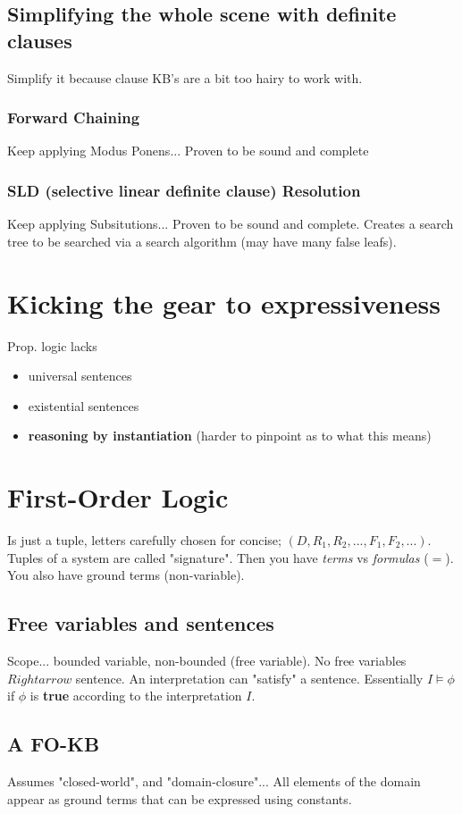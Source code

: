 \documentclass{article}
\begin{document}
\subsection{Simplifying the whole scene with definite clauses}
Simplify it because clause KB's are a bit too hairy to work with.

\subsubsection{Forward Chaining}
Keep applying Modus Ponens... Proven to be sound and complete
\subsubsection{SLD (selective linear definite clause) Resolution}
Keep applying Subsitutions... Proven to be sound and complete. Creates a search tree to be searched via a search algorithm (may have many false leafs).

\section{Kicking the gear to expressiveness}
Prop. logic lacks
\begin{itemize}
	\item universal sentences
	\item existential sentences
	\item \textbf{reasoning by instantiation} (harder to pinpoint as to what this means)
\end{itemize}

\section{First-Order Logic}
Is just a tuple, letters carefully chosen for concise; $(D, R_1, R_2, ..., F_1, F_2, ...)$. Tuples of a system are called "signature". Then you have \emph{terms} vs \emph{formulas} ($=$). You also have ground terms (non-variable).

\subsection{Free variables and sentences}
Scope... bounded variable, non-bounded (free variable). No free variables $Rightarrow$ sentence. An interpretation can "satisfy" a sentence. Essentially $I \vDash \phi$ if $\phi$ is \textbf{true} according to the interpretation $I$.

\subsection{A FO-KB}
Assumes "closed-world", and "domain-closure"... All elements of the domain appear as ground terms that can be expressed using constants.
\end{document}
